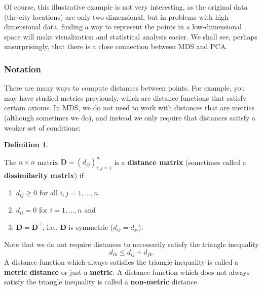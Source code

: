 \documentclass[
]{book}
\providecommand{\tightlist}{%
  \setlength{\itemsep}{0pt}\setlength{\parskip}{0pt}}
\theoremstyle{definition}
\newtheorem{definition}{Definition}[chapter]
\theoremstyle{definition}
\theoremstyle{definition}
\theoremstyle{definition}
\theoremstyle{remark}
\begin{document}
Of course, this illustrative example is not very interesting, as the original data (the city locations) are only two-dimensional, but in problems with high dimensional data, finding a way to
represent the points in a low-dimensional space will make visualization and statistical analysis easier. We shall see, perhaps unsurprisingly, that there is a close connection between MDS and PCA.

\hypertarget{notation-2}{%
\subsubsection*{Notation}\label{notation-2}}

There are many ways to compute distances between points. For example, you may have studied metrics previously, which are distance functions that satisfy certain axioms. In MDS, we do not need to work with distances that are metrics (although sometimes we do), and instead we only require that distances satisfy a weaker set of conditions:

\begin{definition}
\protect\hypertarget{def:distanceD}{}\label{def:distanceD}

The \(n \times n\) matrix \(\mathbf D=(d_{ij})_{i,j=1}^n\) is a \textbf{distance matrix} (sometimes called a \textbf{dissimilarity matrix}) if

\begin{enumerate}
\def\labelenumi{\arabic{enumi}.}
\tightlist
\item
  \(d_{ij}\geq 0\) for all \(i, j=1,\ldots,n\).
\item
  \(d_{ii}=0\) for \(i=1,\ldots, n\) and
\item
  \(\mathbf D=\mathbf D^\top\), i.e., \(\mathbf D\) is symmetric (\(d_{ij}=d_{ji}\)).
\end{enumerate}

\end{definition}

Note that we do not require distances to necessarily satisfy the triangle inequality
\begin{equation}
d_{ik} \leq d_{ij}+d_{jk}.
\label{eq:triangle}
\end{equation}
A distance function which always satisfies the triangle inequality is called a \textbf{metric distance}
or just a \textbf{metric}. A distance function which does not always satisfy the triangle inequality is called a
\textbf{non-metric} distance.
\end{document}
